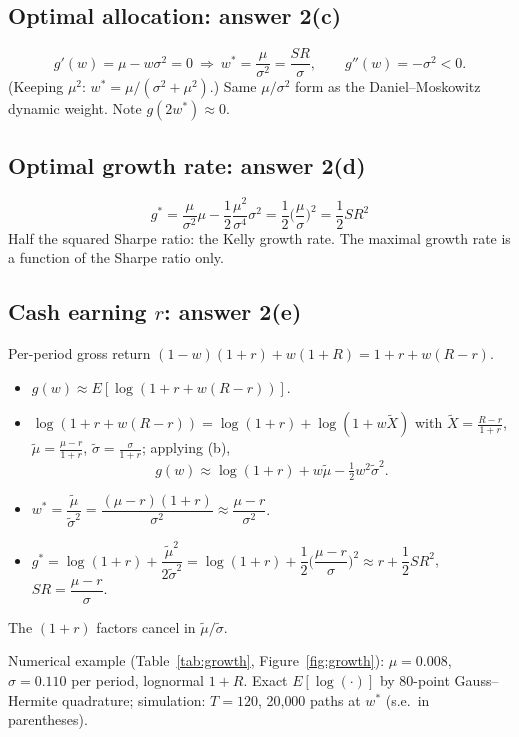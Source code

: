 \documentclass[11pt,letterpaper]{article}
\newcommand{\rMu}{0.008}
\newcommand{\rSigma}{0.110}
\newcommand{\rPeriods}{120}
\newcommand{\rPaths}{20{,}000}
\begin{document}
\subsection*{Optimal allocation: answer 2(c)}
\[
g'(w)=\mu-w\sigma^2=0\ \Rightarrow\ \boxed{w^*=\frac{\mu}{\sigma^2}=\frac{SR}{\sigma}},\qquad g''(w)=-\sigma^2<0 .
\]
(Keeping $\mu^2$: $w^*=\mu/(\sigma^2+\mu^2)$.) Same $\mu/\sigma^2$ form as the Daniel--Moskowitz dynamic weight. Note $g(2w^*)\approx0$.

\subsection*{Optimal growth rate: answer 2(d)}
\[
g^*=\frac{\mu}{\sigma^2}\mu-\frac12\frac{\mu^2}{\sigma^4}\sigma^2=\boxed{\frac12\Big(\frac{\mu}{\sigma}\Big)^2=\frac12SR^2}
\]
Half the squared Sharpe ratio: the Kelly growth rate. The maximal growth rate is a function of the Sharpe ratio only.

\subsection*{Cash earning $r$: answer 2(e)}
Per-period gross return $(1-w)(1+r)+w(1+R)=1+r+w(R-r)$.
\begin{itemize}\setlength{\itemsep}{1pt}
\item[(a$'$)] $g(w)\approx E[\log(1+r+w(R-r))]$.
\item[(b$'$)] $\log(1+r+w(R-r))=\log(1+r)+\log(1+w\tilde X)$ with $\tilde X=\frac{R-r}{1+r}$, $\tilde\mu=\frac{\mu-r}{1+r}$, $\tilde\sigma=\frac{\sigma}{1+r}$; applying (b),
\[g(w)\approx\log(1+r)+w\tilde\mu-\tfrac12w^2\tilde\sigma^2 .\]
\item[(c$'$)] $w^*=\dfrac{\tilde\mu}{\tilde\sigma^2}=\dfrac{(\mu-r)(1+r)}{\sigma^2}\approx\dfrac{\mu-r}{\sigma^2}$.
\item[(d$'$)] $g^*=\log(1+r)+\dfrac{\tilde\mu^2}{2\tilde\sigma^2}=\log(1+r)+\dfrac12\Big(\dfrac{\mu-r}{\sigma}\Big)^2\approx r+\dfrac12SR^2$, $SR=\dfrac{\mu-r}{\sigma}$.
\end{itemize}
The $(1+r)$ factors cancel in $\tilde\mu/\tilde\sigma$.

Numerical example (Table~\ref{tab:growth}, Figure~\ref{fig:growth}): $\mu=\rMu$, $\sigma=\rSigma$ per period, lognormal $1+R$. Exact $E[\log(\cdot)]$ by 80-point Gauss--Hermite quadrature; simulation: $T=\rPeriods$, \rPaths{} paths at $w^*$ (s.e.\ in parentheses).
\end{document}
